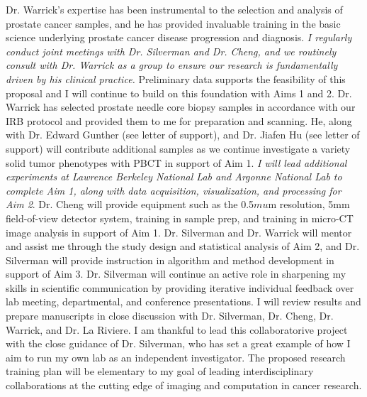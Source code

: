 \documentclass{NIHGrant}
\begin{document}
Dr. Warrick's expertise has been instrumental to the selection and analysis of prostate cancer samples, and he has provided invaluable training in the basic science underlying prostate cancer disease progression and diagnosis. \emph{I regularly conduct joint meetings with Dr. Silverman and Dr. Cheng, and we routinely consult with Dr. Warrick as a group to ensure our research is fundamentally driven by his clinical practice.} Preliminary data supports the feasibility of this proposal and I will continue to build on this foundation with Aims 1 and 2.  Dr. Warrick has selected prostate needle core biopsy samples in accordance with our IRB protocol and provided them to me for preparation and scanning. He, along with Dr. Edward Gunther (see letter of support), and Dr. Jiafen Hu (see letter of support) will contribute additional samples as we continue investigate a variety solid tumor phenotypes with PBCT in support of Aim 1. \emph{I will lead additional experiments at Lawrence Berkeley National Lab and Argonne National Lab to complete Aim 1, along with data acquisition, visualization, and processing for Aim 2}. Dr. Cheng will provide equipment such as the 0.5$mu$m resolution, 5mm field-of-view detector system, training in sample prep, and training in micro-CT image analysis in support of Aim 1. Dr. Silverman and Dr. Warrick will mentor and assist me through the study design and statistical analysis of Aim 2, and Dr. Silverman will provide instruction in algorithm and method development in support of Aim 3. Dr. Silverman will continue an active role in sharpening my skills in scientific communication by providing iterative individual feedback over lab meeting, departmental, and conference presentations. I will review results and prepare manuscripts in close discussion with Dr. Silverman, Dr. Cheng, Dr. Warrick, and Dr. La Riviere. I am thankful to lead this collaboratorive project with the close guidance of Dr. Silverman, who has set a great example of how I aim to run my own lab as an independent investigator. The proposed research training plan will be elementary to my goal of leading interdisciplinary collaborations at the cutting edge of imaging and computation in cancer research.


\end{document}
